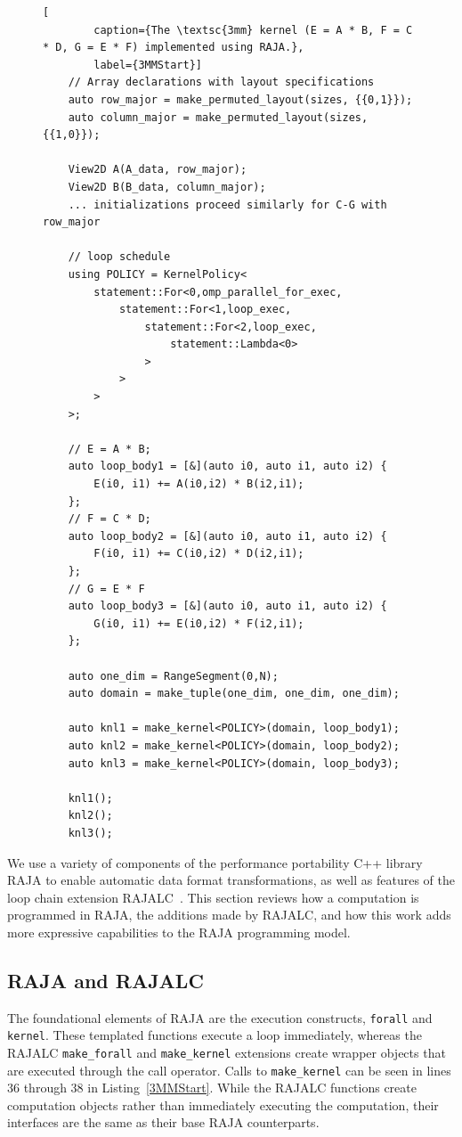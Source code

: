 \documentclass[sigconf,review=true]{acmart}
\begin{document}
\begin{figure}
	\begin{lstlisting}[
		caption={The \textsc{3mm} kernel (E = A * B, F = C * D, G = E * F) implemented using RAJA.},
		label={3MMStart}]
	// Array declarations with layout specifications
	auto row_major = make_permuted_layout(sizes, {{0,1}});
	auto column_major = make_permuted_layout(sizes, {{1,0}});

	View2D A(A_data, row_major);
	View2D B(B_data, column_major);
	... initializations proceed similarly for C-G with row_major

	// loop schedule
	using POLICY = KernelPolicy<
		statement::For<0,omp_parallel_for_exec,
			statement::For<1,loop_exec,
				statement::For<2,loop_exec,
					statement::Lambda<0>
				>
			>
		>
	>;

	// E = A * B;
	auto loop_body1 = [&](auto i0, auto i1, auto i2) {
		E(i0, i1) += A(i0,i2) * B(i2,i1);
	};
	// F = C * D;
	auto loop_body2 = [&](auto i0, auto i1, auto i2) {
		F(i0, i1) += C(i0,i2) * D(i2,i1);
	};
	// G = E * F
	auto loop_body3 = [&](auto i0, auto i1, auto i2) {
		G(i0, i1) += E(i0,i2) * F(i2,i1);
	};
	
	auto one_dim = RangeSegment(0,N);
	auto domain = make_tuple(one_dim, one_dim, one_dim);

	auto knl1 = make_kernel<POLICY>(domain, loop_body1);
	auto knl2 = make_kernel<POLICY>(domain, loop_body2);
	auto knl3 = make_kernel<POLICY>(domain, loop_body3);

	knl1();
	knl2();
	knl3();
	\end{lstlisting}
\end{figure}

\label{sec:kernelObjects}

We use a variety of components of the performance portability C++ library RAJA to enable automatic data format transformations, as well as features of the loop chain extension RAJALC~\cite{neth2021inter}. 
This section reviews how a computation is programmed in RAJA, the additions made by RAJALC, and how this work adds more expressive capabilities to the RAJA programming model.

\subsection{RAJA and RAJALC}

The foundational elements of RAJA are the execution constructs, \verb.forall. and \verb.kernel.. 
These templated functions execute a loop immediately, whereas the RAJALC \verb.make_forall. and \verb.make_kernel. extensions create wrapper objects that are executed through the call operator. 
Calls to \verb.make_kernel. can be seen in lines 36 through 38 in Listing~\ref{3MMStart}. 
While the RAJALC functions create computation objects rather than immediately executing the computation, their interfaces are the same as their base RAJA counterparts.
\end{document}
